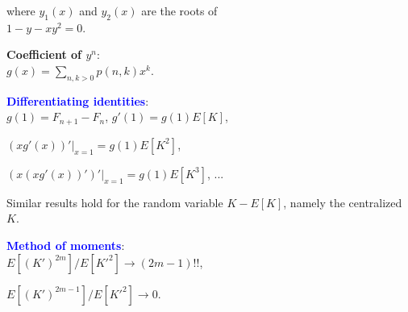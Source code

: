 \documentclass[landscape,final,columns=3]{baposter}
\begin{document}
\begin{poster}
{\begin{multicols}{2}
\begin{list}{}{\leftmargin=1em}
where $y_1(x)$ and $y_2(x)$ are the roots of\\
$1-y-xy^2=0$.

{\bf{Coefficient of $y^n$}}: \\
$g(x)=\sum_{n,k>0}p(n,k)x^k$.

\vspace{-0.02in}

\item {{\textcolor{blue}{\bf{Differentiating identities}}}}: \\
$g(1)=F_{n+1}-F_n$,  $g'(1)=g(1)E[K]$,

$\left(xg'(x)\right)'|_{x=1}=g(1)E[K^2]$,

$\left(x\left(xg'(x)\right)'\right)'|_{x=1}=g(1)E[K^3]$, ...

Similar results hold for the random variable $K-E[K]$, namely the centralized $K$.

\vspace{-0.02in}

\item {{\textcolor{blue}{\bf{Method of moments}}}}: \\
$E[(K')^{2m}]/E[K'^2]\rightarrow (2m-1)!!$,

$E[(K')^{2m-1}]/E[K'^2]\rightarrow 0$.
\end{list}

\vspace{0.1em}

\end{multicols}

}

\end{poster}%
%
\end{document}
